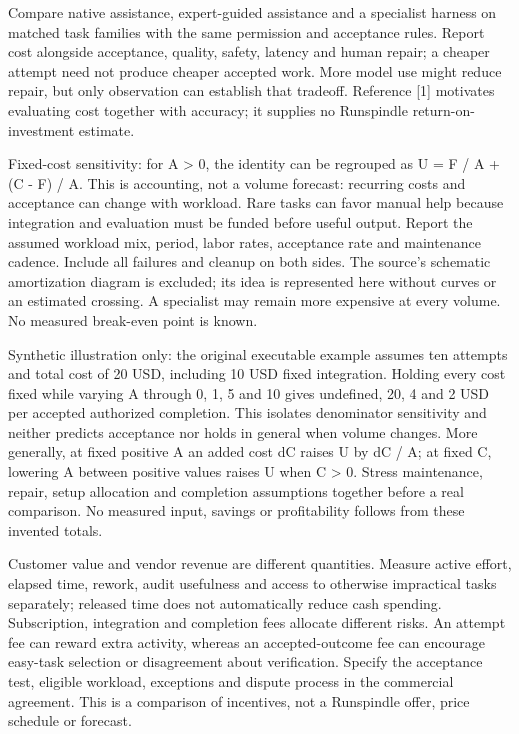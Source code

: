 \documentclass[11pt,letterpaper]{article}
\begin{document}
Compare native assistance, expert-guided assistance and a specialist harness on matched task families with the same permission and acceptance rules. Report cost alongside acceptance, quality, safety, latency and human repair; a cheaper attempt need not produce cheaper accepted work. More model use might reduce repair, but only observation can establish that tradeoff. Reference [1] motivates evaluating cost together with accuracy; it supplies no Runspindle return-on-investment estimate.

Fixed-cost sensitivity: for A > 0, the identity can be regrouped as U = F / A + (C - F) / A. This is accounting, not a volume forecast: recurring costs and acceptance can change with workload. Rare tasks can favor manual help because integration and evaluation must be funded before useful output. Report the assumed workload mix, period, labor rates, acceptance rate and maintenance cadence. Include all failures and cleanup on both sides. The source's schematic amortization diagram is excluded; its idea is represented here without curves or an estimated crossing. A specialist may remain more expensive at every volume. No measured break-even point is known.

Synthetic illustration only: the original executable example assumes ten attempts and total cost of 20 USD, including 10 USD fixed integration. Holding every cost fixed while varying A through 0, 1, 5 and 10 gives undefined, 20, 4 and 2 USD per accepted authorized completion. This isolates denominator sensitivity and neither predicts acceptance nor holds in general when volume changes. More generally, at fixed positive A an added cost dC raises U by dC / A; at fixed C, lowering A between positive values raises U when C > 0. Stress maintenance, repair, setup allocation and completion assumptions together before a real comparison. No measured input, savings or profitability follows from these invented totals.

Customer value and vendor revenue are different quantities. Measure active effort, elapsed time, rework, audit usefulness and access to otherwise impractical tasks separately; released time does not automatically reduce cash spending. Subscription, integration and completion fees allocate different risks. An attempt fee can reward extra activity, whereas an accepted-outcome fee can encourage easy-task selection or disagreement about verification. Specify the acceptance test, eligible workload, exceptions and dispute process in the commercial agreement. This is a comparison of incentives, not a Runspindle offer, price schedule or forecast.
\end{document}
